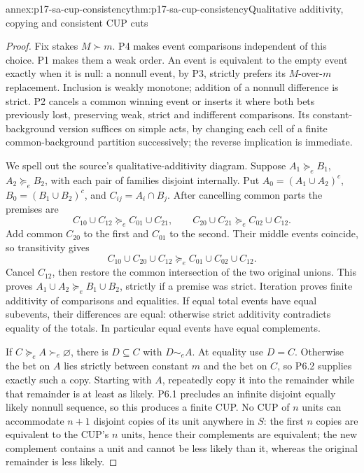 
\begin{annexitem}{annex:p17-sa-cup-consistency}{thm:p17-sa-cup-consistency}{Qualitative additivity, copying and consistent CUP cuts}
\begin{proof}
Fix stakes \(M\succ m\). P4 makes event comparisons independent
of this choice. P1 makes them a weak order. An event is equivalent
to the empty event exactly when it is null: a nonnull event,
by P3, strictly prefers its \(M\)-over-\(m\) replacement.
Inclusion is weakly monotone; addition of a nonnull difference
is strict. P2 cancels a common winning event or inserts it
where both bets previously lost, preserving weak, strict and
indifferent comparisons. Its constant-background version suffices
on simple acts, by changing each cell of a finite common-background
partition successively; the reverse implication is immediate.

We spell out the source's qualitative-additivity diagram.
Suppose \(A_1\succeq_e B_1\), \(A_2\succeq_e B_2\), with
each pair of families disjoint internally. Put
\(A_0=(A_1\cup A_2)^c\), \(B_0=(B_1\cup B_2)^c\),
and \(C_{ij}=A_i\cap B_j\).
After cancelling common parts the premises are
\[
 C_{10}\cup C_{12}\succeq_e C_{01}\cup C_{21},\qquad
 C_{20}\cup C_{21}\succeq_e C_{02}\cup C_{12}.
\]
Add common \(C_{20}\) to the first and \(C_{01}\) to the
second. Their middle events coincide, so transitivity gives
\[
 C_{10}\cup C_{20}\cup C_{12}
 \succeq_e C_{01}\cup C_{02}\cup C_{12}.
\]
Cancel \(C_{12}\), then restore the common intersection of
the two original unions. This proves
\(A_1\cup A_2\succeq_e B_1\cup B_2\), strictly if a
premise was strict. Iteration proves finite additivity of
comparisons and equalities. If equal total events have equal
subevents, their differences are equal: otherwise strict
additivity contradicts equality of the totals. In particular
equal events have equal complements.

If \(C\succeq_e A\succ_e\varnothing\), there is
\(D\subseteq C\) with \(D\sim_e A\).
At equality use \(D=C\). Otherwise the bet on \(A\) lies
strictly between constant \(m\) and the bet on \(C\), so
P6.2 supplies exactly such a copy.
Starting with \(A\), repeatedly copy it into the remainder
while that remainder is at least as likely. P6.1 precludes
an infinite disjoint equally likely nonnull sequence,
so this produces a finite CUP.
No CUP of \(n\) units can accommodate \(n+1\) disjoint
copies of its unit anywhere in \(S\): the first \(n\) copies
are equivalent to the CUP's \(n\) units, hence their
complements are equivalent; the new complement contains
a unit and cannot be less likely than it, whereas the
original remainder is less likely.


\end{proof}
\end{annexitem}
